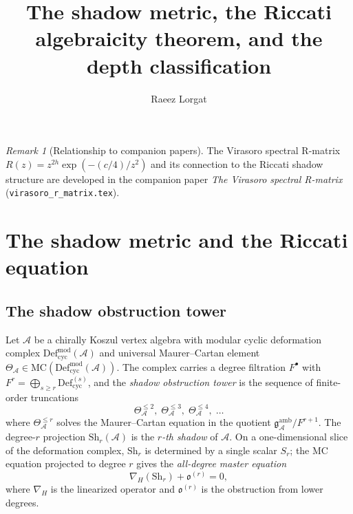 \documentclass[11pt]{article}
\title{The shadow metric, the Riccati algebraicity theorem, and the depth classification}
\author{Raeez Lorgat}
\date{}
\theoremstyle{plain}
\theoremstyle{definition}
\theoremstyle{remark}
\newtheorem{remark}[theorem]{Remark}
\begin{document}
\maketitle
\fi


\begin{remark}[Relationship to companion papers]
The Virasoro spectral R-matrix
$R(z) = z^{2h}\exp(-(c/4)/z^2)$ and its connection to the Riccati
shadow structure are developed in the companion paper \emph{The
Virasoro spectral R-matrix} (\texttt{virasoro\_r\_matrix.tex}).
\end{remark}


\section{The shadow metric and the Riccati equation}
\label{sec:shadow-metric}

\subsection{The shadow obstruction tower}

Let $\mathcal{A}$ be a chirally Koszul vertex algebra with modular
cyclic deformation complex $\mathrm{Def}_{\mathrm{cyc}}^{\mathrm{mod}}(\mathcal{A})$
and universal Maurer--Cartan element
$\Theta_{\mathcal{A}} \in \mathrm{MC}(\mathrm{Def}_{\mathrm{cyc}}^{\mathrm{mod}}(\mathcal{A}))$.
The complex carries a degree filtration $F^{\bullet}$ with
$F^r = \bigoplus_{s \geq r} \mathrm{Def}_{\mathrm{cyc}}^{(s)}$,
and the \emph{shadow obstruction tower} is the sequence of
finite-order truncations
\[
 \Theta_{\mathcal{A}}^{\leq 2},\;
 \Theta_{\mathcal{A}}^{\leq 3},\;
 \Theta_{\mathcal{A}}^{\leq 4},\;
 \ldots
\]
where $\Theta_{\mathcal{A}}^{\leq r}$ solves the Maurer--Cartan equation
in the quotient $\mathfrak{g}_{\mathcal{A}}^{\mathrm{amb}} / F^{r+1}$.
The degree-$r$ projection $\mathrm{Sh}_r(\mathcal{A})$ is the
\emph{$r$-th shadow} of $\mathcal{A}$. On a one-dimensional
slice of the deformation complex, $\mathrm{Sh}_r$ is determined
by a single scalar $S_r$; the MC equation projected to degree $r$
gives the \emph{all-degree master equation}
\begin{equation}
\label{eq:master-equation}
 \nabla_H(\mathrm{Sh}_r) + \mathfrak{o}^{(r)} = 0,
\end{equation}
where $\nabla_H$ is the linearized operator and $\mathfrak{o}^{(r)}$
is the obstruction from lower degrees.
\end{document}
